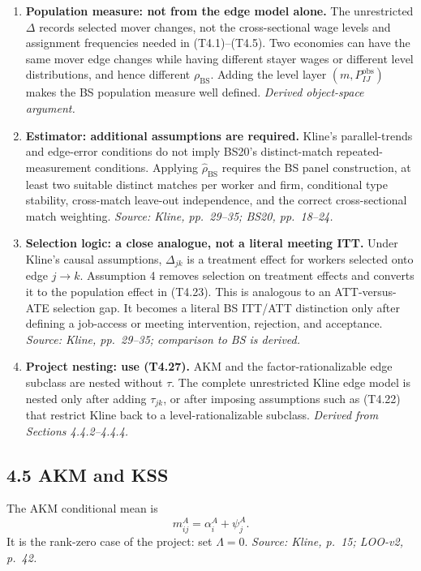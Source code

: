 \documentclass[11pt]{article}
\begin{document}
\begin{enumerate}
\item \textbf{Population measure: not from the edge model alone.}
  The unrestricted \(\Delta\) records selected mover changes, not the
  cross-sectional wage levels and assignment frequencies needed in
  (T4.1)--(T4.5).  Two economies can have the same mover edge changes while
  having different stayer wages or different level distributions, and hence
  different \(\rho_{\mathrm{BS}}\).  Adding the level layer
  \((m,P^{\mathrm{obs}}_{IJ})\) makes the BS population measure well defined.
  \textit{Derived object-space argument.}
\item \textbf{Estimator: additional assumptions are required.}
  Kline's parallel-trends and edge-error conditions do not imply BS20's
  distinct-match repeated-measurement conditions.  Applying
  \(\widehat\rho_{\mathrm{BS}}\) requires the BS panel construction,
  at least two suitable distinct matches per worker and firm, conditional
  type stability, cross-match leave-out independence, and the correct
  cross-sectional match weighting.
  \textit{Source: Kline, pp.\ 29--35; BS20, pp.\ 18--24.}
\item \textbf{Selection logic: a close analogue, not a literal meeting ITT.}
  Under Kline's causal assumptions,
  \(\Delta_{jk}\) is a treatment effect for workers selected onto edge
  \(j\to k\).  Assumption 4 removes selection on treatment effects and converts
  it to the population effect in (T4.23).  This is analogous to an
  ATT-versus-ATE selection gap.  It becomes a literal BS ITT/ATT distinction
  only after defining a job-access or meeting intervention, rejection, and
  acceptance.
  \textit{Source: Kline, pp.\ 29--35; comparison to BS is derived.}
\item \textbf{Project nesting: use (T4.27).}
  AKM and the factor-rationalizable edge subclass are nested without
  \(\tau\).  The complete unrestricted Kline edge model is nested only after
  adding \(\tau_{jk}\), or after imposing assumptions such as (T4.22) that
  restrict Kline back to a level-rationalizable subclass.
  \textit{Derived from Sections 4.4.2--4.4.4.}
\end{enumerate}

\subsection{4.5 AKM and KSS}

The AKM conditional mean is
\[
m^A_{ij}=\alpha_i^A+\psi_j^A.
\tag{T4.28}
\]
It is the rank-zero case of the project: set \(\Lambda=0\).
\textit{Source: Kline, p.\ 15; LOO-v2, p.\ 42.}
\end{document}

